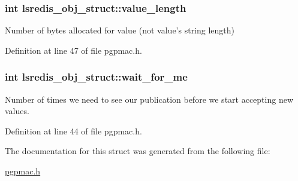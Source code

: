 \hypertarget{structlsredis__obj__struct_a664f0eaafb8dffc0dbde126e0340efb9}{
\subsubsection[{value\-\_\-length}]{\setlength{\rightskip}{0pt plus 5cm}int lsredis\-\_\-obj\-\_\-struct\-::value\-\_\-length}}\label{structlsredis__obj__struct_a664f0eaafb8dffc0dbde126e0340efb9}


Number of bytes allocated for value (not value's string length) 



Definition at line 47 of file pgpmac.\-h.

\hypertarget{structlsredis__obj__struct_a8bc1a536b7155a1e2a749c7c434b898b}{
\subsubsection[{wait\-\_\-for\-\_\-me}]{\setlength{\rightskip}{0pt plus 5cm}int lsredis\-\_\-obj\-\_\-struct\-::wait\-\_\-for\-\_\-me}}\label{structlsredis__obj__struct_a8bc1a536b7155a1e2a749c7c434b898b}


Number of times we need to see our publication before we start accepting new values. 



Definition at line 44 of file pgpmac.\-h.



The documentation for this struct was generated from the following file\-:\begin{DoxyCompactItemize}
\item 
\hyperlink{pgpmac_8h}{pgpmac.\-h}\end{DoxyCompactItemize}
